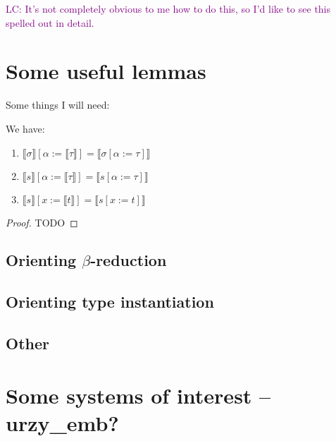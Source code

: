 \documentclass[runningheads,a4paper]{llncs}
\newcommand{\Rules}{\mathcal{R}}
\newcommand{\typeinterpret}[1]{\llbracket #1 \rrbracket}
\newcommand{\interpret}[1]{\llbracket #1 \rrbracket}
\newcommand{\arr}[1]{\longrightarrow_{#1}}
\newcommand{\LC}[1]{\textcolor{purple}{LC: #1}}
\begin{document}
\LC{It's not completely obvious to me how to do this, so I'd like to
  see this spelled out in detail.}

%

\section{Some useful lemmas}

Some things I will need:

\begin{lemma}\label{lem:substitutioninterpret}
We have:
\begin{enumerate}
\item\label{lem:substitutioninterpret:types}
  $\typeinterpret{\sigma}[\alpha:=\typeinterpret{\tau}] =
  \typeinterpret{\sigma[\alpha:=\tau]}$
\item\label{lem:substitutioninterpret:mixed}
  $\interpret{s}[\alpha:=\typeinterpret{\tau}] =
  \interpret{s[\alpha:=\tau]}$
\item\label{lem:substitutioninterpret:terms}
  $\interpret{s}[x:=\interpret{t}] = \interpret{s[x:=t]}$
\end{enumerate}
\end{lemma}

\begin{proof}
TODO
\end{proof}

\subsection{Orienting $\beta$-reduction}

\subsection{Orienting type instantiation}

\subsection{Other}

\section{Some systems of interest -- urzy\_emb?}
\end{document}
